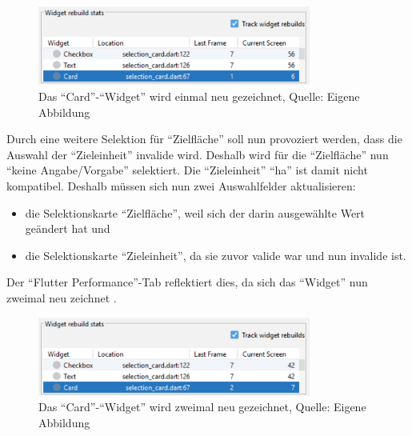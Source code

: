 \begin{figure}[ht]
  \centering
  \ifIncludeFigures
  \includegraphics[width=0.8\textwidth]{Inhalt/Hauptteil/Implementierung/Schritt-5/1rebuild.png}
  \fi
  \caption[Das \enquote{Card}-\enquote{Widget} wird einmal neu gezeichnet]{Das \enquote{Card}-\enquote{Widget} wird einmal neu gezeichnet, Quelle: Eigene Abbildung}
  
  \label{fig:Schritt5_1rebuild}
\end{figure}%


Durch eine weitere Selektion für \enquote{Zielfläche} soll nun provoziert werden, dass die Auswahl der  \enquote{Zieleinheit} invalide wird.
Deshalb wird für die \enquote{Zielfläche} nun \enquote{keine Angabe/Vorgabe} selektiert.
Die \enquote{Zieleinheit} \enquote{ha} ist damit nicht kompatibel.
Deshalb müssen sich nun zwei Auswahlfelder aktualisieren:
\begin{itemize}[topsep=0pt,itemsep=-1ex,partopsep=1ex,parsep=1ex]
  \item die Selektionskarte \enquote{Zielfläche}, weil sich der darin ausgewählte Wert geändert hat und
  \item die Selektionskarte \enquote{Zieleinheit}, da sie zuvor valide war und nun invalide ist.
\end{itemize}

Der \enquote{Flutter Performance}-Tab reflektiert dies,
da sich das \enquote{Widget}  nun zweimal neu zeichnet \Abb{\ref{fig:Schritt5_2rebuilds}}.

\begin{figure}[ht]
  \centering
  \ifIncludeFigures
  \includegraphics[width=0.8\textwidth]{Inhalt/Hauptteil/Implementierung/Schritt-5/2rebuilds.png}
  \fi
  \caption[Das \enquote{Card}-\enquote{Widget} wird zweimal neu gezeichnet]{Das \enquote{Card}-\enquote{Widget} wird zweimal neu gezeichnet, Quelle: Eigene Abbildung}
  
  \label{fig:Schritt5_2rebuilds}
\end{figure}%